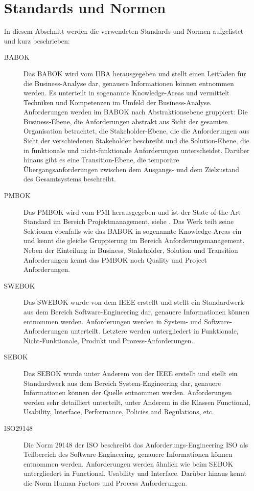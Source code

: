 \section{Standards und Normen}
\label{sec:requirements:standards}
In diesem Abschnitt werden die verwendeten Standards und Normen aufgelistet und kurz beschrieben:
\begin{description}
  \item[BABOK] Das \ac{BABOK} wird vom \ac{IIBA} herausgegeben und stellt einen Leitfaden für die Business-Analyse dar, genauere Informationen können \cite{BABOK} entnommen werden. Es unterteilt in sogenannte Knowledge-Areas und vermittelt Techniken und Kompetenzen im Umfeld der Business-Analyse. Anforderungen werden im \ac{BABOK} nach Abstraktionsebene gruppiert: Die Business-Ebene, die Anforderungen abstrakt aus Sicht der gesamten Organisation betrachtet, die Stakeholder-Ebene, die die Anforderungen aus Sicht der verschiedenen Stakeholder beschreibt und die Solution-Ebene, die in funktionale und nicht-funktionale Anforderungen unterscheidet. Darüber hinaus gibt es eine Transition-Ebene, die temporäre Übergangsanforderungen zwischen dem Ausgangs- und dem Zielzustand des Gesamtsystems beschreibt.
  \item[PMBOK]  Das \ac{PMBOK} wird vom \ac{PMI} herausgegeben und ist der State-of-the-Art Standard im Bereich Projektmanagement, siehe \cite{PMBOK}. Das Werk teilt seine Sektionen ebenfalls wie das \ac{BABOK} in sogenannte Knowledge-Areas ein und kennt die gleiche Gruppierung im Bereich Anforderungsmanagement. Neben der Einteilung in Business, Stakeholder, Solution und Transition Anforderungen kennt das \ac{PMBOK} noch Quality und Project Anforderungen.
  \item[SWEBOK] Das \ac{SWEBOK} wurde von dem \ac{IEEE} erstellt und stellt ein Standardwerk aus dem Bereich Software-Engineering dar, genauere Informationen können \cite{SWEBOK} entnommen werden. Anforderungen werden in System- und Software-Anforderungen unterteilt. Letztere werden untergliedert in Funktionale, Nicht-Funktionale, Produkt und Prozess-Anforderungen.
  \item[SEBOK] Das \ac{SEBOK} wurde unter Anderem von der IEEE erstellt und stellt ein Standardwerk aus dem Bereich System-Engineering dar, genauere Informationen können der Quelle \cite{SEBOK} entnommen werden. Anforderungen werden sehr detailliert unterteilt, unter Anderem in die Klassen Functional, Usability, Interface, Performance, Policies and Regulations, etc.
  \item[ISO29148] Die Norm 29148 der \ac{ISO} beschreibt das Anforderungs-Engineering \ac{ISO} als Teilbereich des Software-Engineering, genauere Informationen können \cite{ISO29148} entnommen werden. Anforderungen werden ähnlich wie beim \ac{SEBOK} untergliedert in Functional, Usability und Interface. Darüber hinaus kennt die Norm Human Factors und Process Anforderungen.

\end{description}
